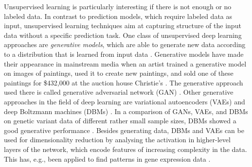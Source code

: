 \documentclass[12pt]{article}
\begin{document}
Unsupervised learning is particularly interesting if there is not enough or no labeled data.
In contrast to prediction models, which require labeled data as input, unsupervised learning techniques aim at capturing structure of the input data without a specific prediction task.
One class of unsupervised deep learning approaches are {\em generative models}, which are able to generate new data according to a distribution that is learned from input data \citep{sejnowski_unsupervised_1999}.
Generative models have made their appearance in mainstream media when an artist trained a generative model on images of paintings, used it to create new paintings, and sold one of these paintings for \$432,000 at the auction house Christie's \citep{cohn_ai_2018}.
The generative approach used there is called generative adversarial network (GAN) \citep{goodfellow_generative_2014}.
Other generative approaches in the field of deep learning are variational autoencoders (VAEs) \citep{Kingma2013} and deep Boltzmann machines (DBMs) \citep{salakhutdinov2009DBMs}.
In a comparison of GANs, VAEs, and DBMs on genetic variant data of different rather small sample sizes, DBMs showed a good generative performance \citep{nussberger_synthetic_2020}.
Besides generating data, DBMs and VAEs can be used for dimensionality reduction by analysing the activation in higher-level layers of the network, which encode features of increasing complexity in the data.
This has, e.g., been applied to find patterns in gene expression data \citep{ding_interpretable_2018, hess_exploring_2020}.
\end{document}

